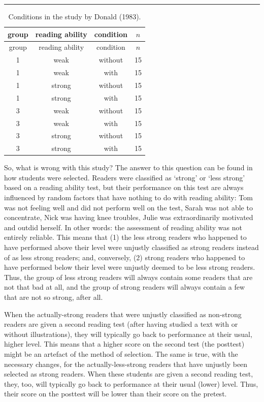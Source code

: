 \documentclass[
]{book}
\begin{document}
\begin{center}\rule{0.5\linewidth}{0.5pt}\end{center}

\begin{longtable}[]{@{}cccc@{}}
\caption{\label{tab:designDona83} Conditions in the study by Donald (1983).}\tabularnewline
\toprule
group & reading ability & condition & \(n\) \\
\midrule
\endfirsthead
\toprule
group & reading ability & condition & \(n\) \\
\midrule
\endhead
1 & weak & without & 15 \\
1 & weak & with & 15 \\
1 & strong & without & 15 \\
1 & strong & with & 15 \\
3 & weak & without & 15 \\
3 & weak & with & 15 \\
3 & strong & without & 15 \\
3 & strong & with & 15 \\
\bottomrule
\end{longtable}

So, what is wrong with this study? The answer to this question can be found in how students were selected. Readers were classified as `strong' or `less strong' based on a reading ability test, but their performance on this test are always influenced by random factors that have nothing to do with reading ability: Tom was not feeling well and did not perform well on the test, Sarah was not able to concentrate, Nick was having knee troubles, Julie was extraordinarily motivated and outdid herself. In other words: the assessment of reading ability was not entirely reliable. This means that (1) the less strong readers who happened to have performed above their level were unjustly classified as strong readers instead of as less strong readers; and, conversely, (2) strong readers who happened to have performed below their level were unjustly deemed to be less strong readers. Thus, the group of less strong readers will always contain some readers that are not that bad at all, and the group of strong readers will always contain a few that are not so strong, after all.

When the actually-strong readers that were unjustly classified as non-strong readers are given a second reading test (after having studied a text with or without illustrations), they will typically go back to performance at their usual, higher level. This means that a higher score on the second test (the posttest) might be an artefact of the method of selection. The same is true, with the necessary changes, for the actually-less-strong readers that have unjustly been selected as strong readers. When these students are given a second reading test, they, too, will typically go back to performance at their usual (lower) level. Thus, their score on the posttest will be lower than their score on the pretest.
\end{document}

